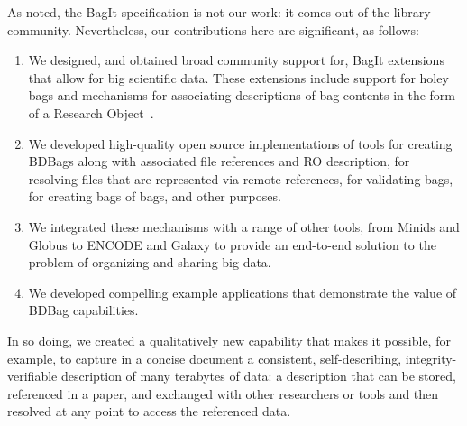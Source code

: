 \documentclass[11pt]{article}
\begin{document}
As noted, the BagIt specification is not our work: it comes out of the library community.
Nevertheless, our contributions here are significant, as follows:
\begin{enumerate}
\item
We designed, and obtained broad community support for, BagIt extensions that allow for big scientific data.
These extensions include support for
holey bags and mechanisms for associating descriptions of bag contents in the form of a Research Object~\cite{bechhofer2013linked}.

\item
We developed high-quality open source implementations of tools for creating BDBags along with associated
file references and RO description, for resolving files that are represented via remote references, for validating
bags, for creating bags of bags, and other purposes.

\item
We integrated these mechanisms with a range of other tools, 
from Minids and Globus to ENCODE and Galaxy 
to provide an end-to-end solution to the problem of organizing and sharing big data. 

\item
We developed compelling example applications that demonstrate the value of BDBag capabilities.

\end{enumerate}

In so doing, we created a qualitatively new capability that makes it possible, for example, to
capture in a concise document a consistent, self-describing, integrity-verifiable description of many terabytes of data:
a description that can be stored, referenced in a paper, and exchanged with other researchers or tools
and then resolved at any point to access the referenced data.


\end{document}
